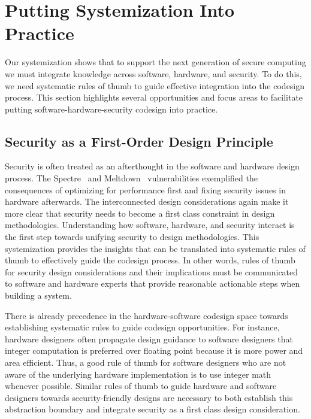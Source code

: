 \section{Putting Systemization Into Practice}
\label{sec:themes}

Our systemization shows that to support the next generation of secure computing we must integrate knowledge across software, hardware, and security.
To do this, we need systematic rules of thumb to guide effective integration into the codesign process.
This section highlights several opportunities and focus areas to facilitate putting software-hardware-security codesign into practice.

\subsection{Security as a First-Order Design Principle}
Security is often treated as an afterthought in the software and hardware design process.
The Spectre~\cite{spectre} and Meltdown~\cite{meltdown} vulnerabilities exemplified the consequences of optimizing for performance first and fixing security issues in hardware afterwards.
The interconnected design considerations again make it more clear that security needs to become a first class constraint in design methodologies.
Understanding how software, hardware, and security interact is the first step towards unifying security to design methodologies.
This systemization provides the insights that can be translated into systematic rules of thumb to effectively guide the codesign process.
In other words, rules of thumb for security design considerations and their implications must be communicated to software and hardware experts that provide reasonable actionable steps when building a system.

There is already precedence in the hardware-software codesign space towards establishing systematic rules to guide codesign opportunities.
For instance, hardware designers often propagate design guidance to software designers that integer computation is preferred over floating point because it is more power and area efficient.
Thus, a good rule of thumb for software designers who are not aware of the underlying hardware implementation is to use integer math whenever possible.
Similar rules of thumb to guide hardware and software designers towards security-friendly designs are necessary to both establish this abstraction boundary and integrate security as a first class design consideration.

